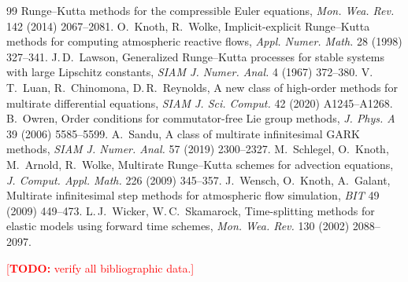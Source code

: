 \documentclass[11pt,a4paper]{article}
\theoremstyle{definition}
\theoremstyle{remark}
\newcommand{\todo}[1]{\textcolor{red}{[\textbf{TODO:} #1]}}
\begin{document}
\begin{thebibliography}{99}
 Runge--Kutta methods for the compressible Euler equations, \emph{Mon.
 Wea. Rev.} 142 (2014) 2067--2081.
 O.~Knoth, R.~Wolke, Implicit-explicit
 Runge--Kutta methods for computing atmospheric reactive flows,
 \emph{Appl. Numer. Math.} 28 (1998) 327--341.
 J.\,D.~Lawson, Generalized Runge--Kutta processes
 for stable systems with large Lipschitz constants, \emph{SIAM J. Numer.
 Anal.} 4 (1967) 372--380.
 V.\,T.~Luan, R.~Chinomona,
 D.\,R.~Reynolds, A new class of high-order methods for multirate
 differential equations, \emph{SIAM J. Sci. Comput.} 42 (2020)
 A1245--A1268.
 B.~Owren, Order conditions for commutator-free Lie
 group methods, \emph{J. Phys. A} 39 (2006) 5585--5599.
 A.~Sandu, A class of multirate infinitesimal GARK
 methods, \emph{SIAM J. Numer. Anal.} 57 (2019) 2300--2327.
 M.~Schlegel, O.~Knoth, M.~Arnold,
 R.~Wolke, Multirate Runge--Kutta schemes for advection equations,
 \emph{J. Comput. Appl. Math.} 226 (2009) 345--357.
 J.~Wensch, O.~Knoth, A.~Galant, Multirate
 infinitesimal step methods for atmospheric flow simulation, \emph{BIT}
 49 (2009) 449--473.
 L.\,J.~Wicker, W.\,C.~Skamarock,
 Time-splitting methods for elastic models using forward time schemes,
 \emph{Mon. Wea. Rev.} 130 (2002) 2088--2097.
\end{thebibliography}
\noindent\todo{verify all bibliographic data.}
\end{document}
